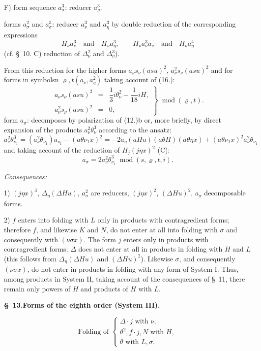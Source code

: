 \documentclass[11pt]{article}
\newcommand{\A}{\Delta}
\newcommand{\R}{\varrho}
\newcommand{\modu}[1]{\;\operatorname{mod} #1}
\begin{document}
\noindent F) form sequence $a_\sigma^3$: reducer $a_\R^3$.

forms $a_\sigma^2$ and $a_\sigma^3$: reducer $a_\nu^3$ and $a_\eta^3$ by double reduction of the corresponding expressions
\[
H_\nu a_\nu^3\quad\text{and}\quad H_\nu a_\eta^3,
\qquad
H_\nu a_\nu^3a_\nu\quad\text{and}\quad H_\nu a_\eta^4
\]
(cf. \S\ 10. C) reduction of $\A_\nu^2$ and $\A_\nu^3$).

From this reduction for the higher forms $a_\nu s_\nu(asu)^2$, $a_\nu^2s_\nu(asu)^2$ and for forms in symbolsn $\R,t(a_\nu,a_\eta^2)$ taking account of (16.):
\[
\tag{19}
\left.\begin{array}{rcl}
a_\nu s_\nu(asu)^2&=&\dfrac13 i\theta_\nu^2-\dfrac1{18}iH,\\[0.5em]
a_\nu^2s_\nu(asu)^2&=&0,
\end{array}\right\}\modu{(\R,t)}.
\]
form $a_\sigma$: decomposes by polarization of (12.)b or, more briefly, by direct expansion of the products $a_\nu^2\theta_\nu^3$ according to the ansatz:
\[
a_\nu^2\theta_{\nu_1}^3=(a_\nu^2\theta_{\nu_1})a_{\nu_1}-(a\theta\nu_1x)^2
=-2a_\eta(aHu)(a\theta H)(a\theta\eta x)+(a\theta\nu_1x)^2a_\nu^2\theta_{\nu_1}
\]
and taking account of the reduction of $H_j(j\eta x)^2$ (C):
\[
\tag{20}a_\sigma=2a_\nu^2\theta_{\nu_1}^3\modu{(s,\R,t,i)}.
\]

\noindent\emph{Consequences:}

1) $(j\eta x)^3$, $\A_\eta(\A Hu)$, $a_\sigma^2$ are reducers, $(j\eta x)^2$, $(\A Hu)^2$, $a_\sigma$ decomposable forms.

2) $f$ enters into folding with $L$ only in products with contragredient forms; therefore $f$, and likewise $K$ and $N$, do not enter at all into folding with $\sigma$ and consequently with $(\nu\sigma x)$. The form $j$ enters only in products with contragredient forms; $\A$ does not enter at all in products in folding with $H$ and $L$ (this follows from $\A_\eta(\A Hu)$ and $(\A Hu)^2$). Likewise $\sigma$, and consequently $(\nu\sigma x)$, do not enter in products in folding with any form of System I. Thus, among products in System II, taking account of the consequences of \S\ 11, there remain only powers of $H$ and products of $H$ with $L$.

\begin{center}
\textbf{\S\ 13.\quad Forms of the eighth order (System III).}
\end{center}
\[
\text{Folding of }\left\{\begin{array}{l}
\A\cdot j\text{ with }\nu,\\
\theta^2,
 f\cdot j,
 N\text{ with }H,\\
\theta\text{ with }L,\sigma.
\end{array}\right.
\]
\end{document}
